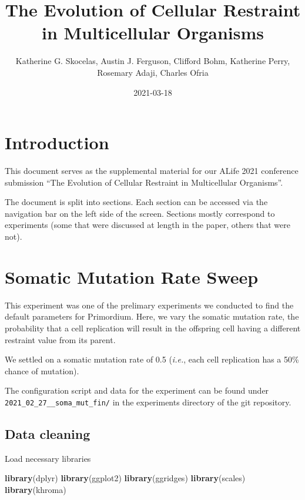 \documentclass[]{book}
\title{The Evolution of Cellular Restraint in Multicellular Organisms}
\author{Katherine G. Skocelas, Austin J. Ferguson, Clifford Bohm, Katherine Perry, Rosemary Adaji, Charles Ofria}
\date{2021-03-18}
\newenvironment{Shaded}{\begin{snugshade}}{\end{snugshade}}
\newcommand{\KeywordTok}[1]{\textcolor[rgb]{0.13,0.29,0.53}{\textbf{#1}}}
\newcommand{\NormalTok}[1]{#1}
\begin{document}
\maketitle

{
\setcounter{tocdepth}{1}
\tableofcontents
}
\hypertarget{introduction}{%
\chapter{Introduction}\label{introduction}}

This document serves as the supplemental material for our ALife 2021 conference submission ``The Evolution of Cellular Restraint in Multicellular Organisms''.

The document is split into sections.
Each section can be accessed via the navigation bar on the left side of the screen.
Sections mostly correspond to experiments (some that were discussed at length in the paper, others that were not).

\hypertarget{somatic-mutation-rate-sweep}{%
\chapter{Somatic Mutation Rate Sweep}\label{somatic-mutation-rate-sweep}}

This experiment was one of the prelimary experiments we conducted to find the default parameters for Primordium.
Here, we vary the somatic mutation rate, the probability that a cell replication will result in the offspring cell having a different restraint value from its parent.

We settled on a somatic mutation rate of 0.5 (\emph{i.e.}, each cell replication has a 50\% chance of mutation).

The configuration script and data for the experiment can be found under \texttt{2021\_02\_27\_\_soma\_mut\_fin/} in the experiments directory of the git repository.

\hypertarget{data-cleaning}{%
\section{Data cleaning}\label{data-cleaning}}

Load necessary libraries

\begin{Shaded}
\begin{Highlighting}[]
\KeywordTok{library}\NormalTok{(dplyr)}
\KeywordTok{library}\NormalTok{(ggplot2)}
\KeywordTok{library}\NormalTok{(ggridges)}
\KeywordTok{library}\NormalTok{(scales)}
\KeywordTok{library}\NormalTok{(khroma)}
\end{Highlighting}
\end{Shaded}
\end{document}
